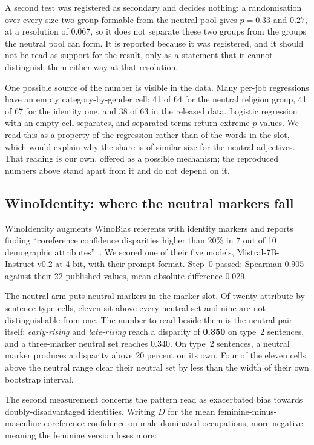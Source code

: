 A second test was registered as secondary and decides nothing: a randomisation
over every size-two group formable from the neutral pool gives $p = 0.33$ and
$0.27$, at a resolution of 0.067, so it does not separate these two groups from
the groups the neutral pool can form. It is reported because it was registered,
and it should not be read as support for the result, only as a statement that
it cannot distinguish them either way at that resolution.

One possible source of the number is visible in the data. Many per-job regressions have an empty
category-by-gender cell: 41 of 64 for the neutral religion group, 41 of 67 for the identity one, and 38 of 63 in the released data. Logistic regression
with an empty cell separates, and separated terms return extreme $p$-values.
We read this as a property of the regression rather than of the words in the
slot, which would explain why the share is of similar size for the neutral
adjectives. That reading is our own, offered as a possible mechanism; the
reproduced numbers above stand apart from it and do not depend on it.

\subsection{WinoIdentity: where the neutral markers fall}

WinoIdentity augments WinoBias referents with identity markers and reports
finding ``coreference confidence disparities higher than 20\% in 7 out of 10
demographic attributes''~\cite{winoidentity2025}. We scored one of their five models,
Mistral-7B-Instruct-v0.2 at 4-bit, with their prompt format. Step~0 passed:
Spearman 0.905 against their 22 published values, mean absolute difference
0.029.

The neutral arm puts neutral markers in the marker slot. Of twenty
attribute-by-sentence-type cells, eleven sit above every neutral set and nine
are not distinguishable from one. The number to read beside them is the neutral pair itself: \emph{early-rising} and \emph{late-rising} reach a disparity of
\textbf{0.350} on type~2 sentences, and a three-marker neutral set reaches
0.340. On type~2 sentences, a neutral marker produces a disparity above 20 percent on its own. Four of the eleven cells above the neutral range clear their neutral set by
less than the width of their own bootstrap interval.

The second measurement concerns the pattern read as exacerbated bias towards
doubly-disadvantaged identities. Writing $D$
for the mean feminine-minus-masculine coreference confidence on male-dominated
occupations, more negative meaning the feminine version loses more:

